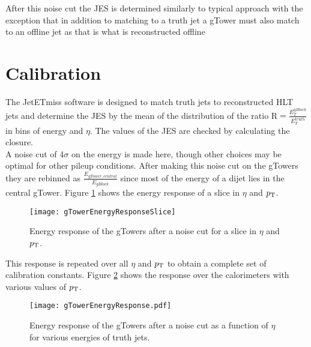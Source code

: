 
After this noise cut the JES is determined similarly to typical approach with the exception that in addition to matching to a truth jet a gTower must also match to an offline jet as that is what is reconstructed offline


\section{Calibration}

The JetETmiss software is designed to match truth jets to reconstructed HLT jets and determine the JES by the mean of the distribution of the ratio R$=\frac{E_{T}^{gBlock}}{E_{T}^{truth}}$ in bins of energy and $\eta$.  The values of the JES are checked by calculating the closure. %
 \\
 
 A noise cut of 4$\sigma$ on the energy is made here, though other choices may be optimal for other pileup conditions.  After making this noise cut on the gTowers they are rebinned as $\frac{E_{gTower, central}}{E_{gBlock}}$ since most of the energy of a dijet lies in the central gTower.  Figure \ref{fig:gTowerEnergyResponseSlice} shows the energy response of a slice in $\eta$ and $p_{\mathrm{T}}$.  \\



 \begin{figure}[h!]
  \centering
	\texttt{[image: gTowerEnergyResponseSlice]}
\caption{\label{fig:gTowerEnergyResponseSlice}{Energy response of the gTowers after a noise cut for a slice in $\eta$ and $p_{\mathrm{T}}$.}} 
\end{figure}

This response is repeated over all $\eta$ and $p_{\mathrm{T}}$ to obtain a complete set of calibration constants.  Figure \ref{fig:gTowerEnergyResponse} shows the response over the calorimeters with various values of $p_{\mathrm{T}}$.
 
 \begin{figure}[h!]
  \centering
	\texttt{[image: gTowerEnergyResponse.pdf]}
\caption{\label{fig:gTowerEnergyResponse}{Energy response of the gTowers after a noise cut as a function of $\eta$ for various energies of truth jets.}} 
\end{figure}
 
